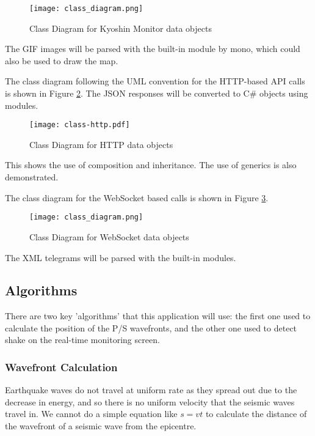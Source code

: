 \begin{figure}[!ht]
    \centering
    \texttt{[image: class\_diagram.png]}
    \caption{Class Diagram for Kyoshin Monitor data objects}
    \label{fig:classes-kmoni}
\end{figure}

The GIF images will be parsed with the built-in  module by mono, which could also be used to draw the map.

The class diagram following the UML convention for the HTTP-based API calls is shown in Figure \ref{fig:classes-http}. The JSON responses will be converted to C\# objects using  modules.

\begin{figure}[!ht]
    \centering
    \texttt{[image: class-http.pdf]}
    \caption{Class Diagram for HTTP data objects}
    \label{fig:classes-http}
\end{figure}

This shows the use of composition and inheritance. The use of generics is also demonstrated.

The class diagram for the WebSocket based calls is shown in Figure \ref{fig:classes-ws}.

\begin{figure}[!ht]
    \centering
    \texttt{[image: class\_diagram.png]}
    \caption{Class Diagram for WebSocket data objects}
    \label{fig:classes-ws}
\end{figure}

The XML telegrams will be parsed with the built-in  modules.

\subsection{Algorithms}

There are two key 'algorithms' that this application will use: the first one used to calculate the position of the P/S wavefronts, and the other one used to detect shake on the real-time monitoring screen.

\subsubsection{Wavefront Calculation}

Earthquake waves do not travel at uniform rate as they spread out due to the decrease in energy, and so there is no uniform velocity that the seismic waves travel in. We cannot do a simple equation like \(s = vt\) to calculate the distance of the wavefront of a seismic wave from the epicentre.

